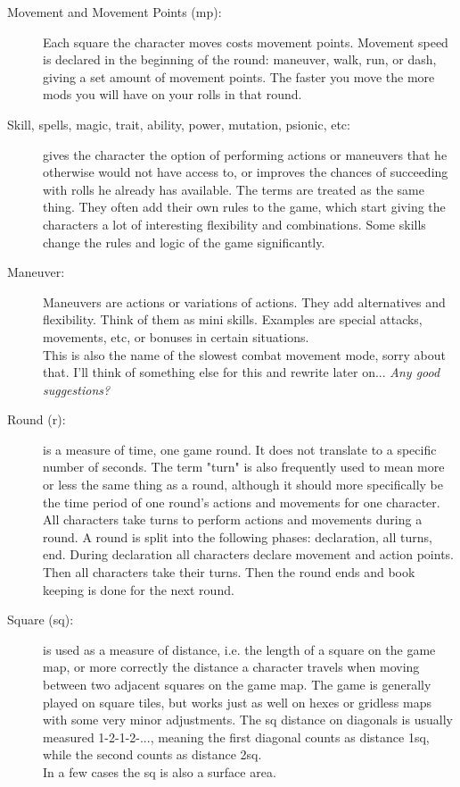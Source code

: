 \begin{description}
\item[Movement and Movement Points (mp):]
Each square the character moves costs movement points. Movement speed is declared in the beginning of the round: maneuver, walk, run, or dash, giving a set amount of movement points. The faster you move the more mods you will have on your rolls in that round.

\item[Skill, spells, magic, trait, ability, power, mutation, psionic, etc:] gives the character the option of performing actions or maneuvers that he otherwise would not have access to, or improves the chances of succeeding with rolls he already has available. The terms are treated as the same thing. They often add their own rules to the game, which start giving the characters a lot of interesting flexibility and combinations. Some skills change the rules and logic of the game significantly.

\item[Maneuver:] Maneuvers are actions or variations of actions. They add alternatives and flexibility. Think of them as mini skills. Examples are special attacks, movements, etc, or bonuses in certain situations.
\\   \todo This is also the name of the slowest combat movement mode, sorry about that. I'll think of something else for this and rewrite later on... \emph{Any good suggestions?}

\item[Round (r):] is a measure of time, one game round. It does not translate to a specific number of seconds. The term "turn" is also frequently used to mean more or less the same thing as a round, although it should more specifically be the time period of one round's actions and movements for one character. All characters take turns to perform actions and movements during a round.
A round is split into the following phases: declaration, all turns, end.
During declaration all characters declare movement and action points. Then all characters take their turns. Then the round ends and book keeping is done for the next round.

\item[Square (sq):] is used as a measure of distance, i.e. the length of a square on the game map, or more correctly the distance a character travels when moving between two adjacent squares on the game map. The game is generally played on square tiles, but works just as well on hexes or gridless maps with some very minor adjustments.
The sq distance on diagonals is usually measured 1-2-1-2-..., meaning the first diagonal counts as distance 1sq, while the second counts as distance 2sq.\\
In a few cases the sq is also a surface area.


\end{description}
